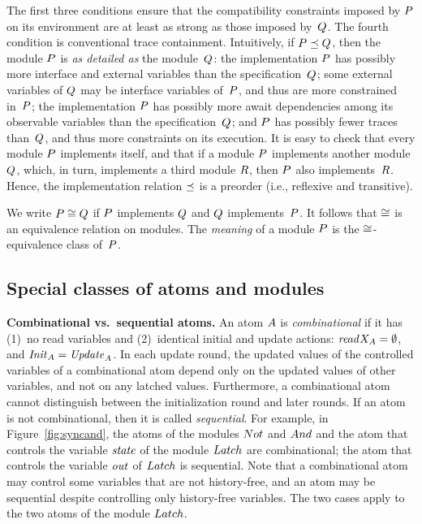 \mypar
The first three conditions ensure that the compatibility constraints imposed
by ${P}$ on its environment are at least as strong as those imposed
by~${Q}$.
The fourth condition is conventional trace containment.
Intuitively, if ${P}\preceq{Q}$, then the module ${P}$ is
{\it as detailed as\/} the module~${Q}$:
the implementation ${P}$ has possibly more interface and external variables
than the specification~${Q}$;
some external variables of ${Q}$ may be interface variables of~${P}$, and
thus are more constrained in~${P}$;
the implementation ${P}$ has possibly more await dependencies among its
observable variables than the specification~${Q}$;
and ${P}$ has possibly fewer traces than~${Q}$, and thus more constraints on
its execution.
It is easy to check that every module ${P}$ implements itself, and that if a
module ${P}$ implements another module ${Q}$, which, in turn, implements a
third module ${R}$, then ${P}$ also implements~${R}$.
Hence, the implementation relation $\preceq$ is a preorder
(i.e., reflexive and transitive).

\mypar
We write ${P}\cong{Q}$ if ${P}$ implements ${Q}$ and ${Q}$
implements~${P}$.
It follows that $\cong$ is an equivalence relation on modules.
The {\em meaning\/} of a module ${P}$ is the $\cong$-equivalence class
of~${P}$.


\subsection{Special classes of atoms and modules}

{\bf Combinational vs.\ sequential atoms.}
An atom $A$ is {\em combinational\/} if it has
(1)~no read variables and
(2)~identical initial and update actions:
${\it read}X_{A}=\emptyset$, and ${\it Init}_{A}={\it Update}_{A}$.
In each update round, the updated values of the controlled variables of a
combinational atom depend only on the updated values of other variables, and
not on any latched values.
Furthermore, a combinational atom cannot distinguish between the
initialization round and later rounds.
If an atom is not combinational, then it is called {\em sequential}.
For example, in Figure~\ref{fig:syncand}, the atoms of the modules $Not$
and $And$ and the atom that controls the variable ${\it state\/}$ of the module
$Latch$ are combinational;
the atom that controls the variable ${\it out\/}$ of $Latch$ is sequential.
Note that a combinational atom may control some variables that are not
history-free, and an atom may be sequential despite controlling only
history-free variables.
The two cases apply to the two atoms of the module $Latch$.



